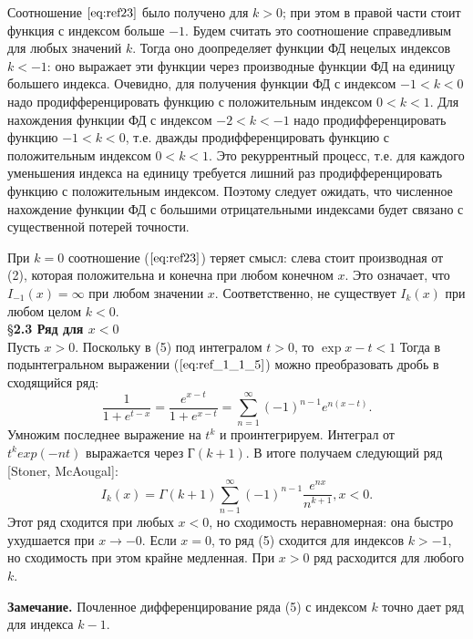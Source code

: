 Соотношение $\ref{eq:ref23}$ было получено для $k > 0$; при этом в правой части стоит
функция с индексом больше $-1$. Будем считать это соотношение справедливым
для любых значений $k$. Тогда оно доопределяет функции ФД нецелых индексов
$k < -1$: оно выражает эти функции через производные функции ФД на единицу
большего индекса. Очевидно, для получения функции ФД с индексом $-1 < k < 0$
надо продифференцировать функцию с положительным индексом $0 < k < 1$. Для
нахождения функции ФД с индексом $-2 < k < -1$ надо продифференцировать
функцию $-1< k < 0$, т.е. дважды продифференцировать функцию с
положительным индексом $0 < k < 1$. Это рекуррентный процесс, т.е. для
каждого уменьшения индекса на единицу требуется лишний раз
продифференцировать функцию с положительным индексом. Поэтому следует
ожидать, что численное нахождение функции ФД с большими отрицательными
индексами будет связано с существенной потерей точности.

При $k = 0$ соотношение ($\ref{eq:ref23}$) теряет смысл: слева стоит производная от (2),
которая положительна и конечна при любом конечном $x$. Это означает, что
$I_{-1}(x) = \infty$ при любом значении $x$. Соответственно, не существует $I_k(x)$ при
любом целом $k < 0$.
\\

\S \textbf{2.3 Ряд для $x < 0$}
\\

Пусть $x > 0$. Поскольку в (5) под интегралом $t > 0$, то $\exp{x-t} < 1$ Тогда в
подынтегральном выражении ($\ref{eq:ref_1_1_5}$) можно преобразовать дробь в сходящийся
ряд:
\begin{equation}
\frac{1}{1+e^{t-x}} = \frac{e^{x-t}}{1+e^{x-t}}=\sum\limits_{n=1}^{\infty} (-1)^{n-1}e^{n(x-t)}.
\end{equation}
Умножим последнее выражение на $t^k$ и проинтегрируем. Интеграл от
$t^{k}exp(-nt)$ выражаeтся через $Г(k + 1)$. В итоге получаем следующий ряд [Stoner, McAougal]:
\begin{equation}
I_k(x)=\Gamma(k+1)\sum\limits_{n-1}^{\infty} (-1)^{n-1}\frac{e^{nx}}{n^{k+1}},x<0.
\end{equation}
Этот ряд сходится при любых $x < 0$, но сходимость неравномерная: она быстро
ухудшается при $x \to -0$. Если $x = 0$, то ряд (5) сходится для индексов $k > -1$, но
сходимость при этом крайне медленная. При $x > 0$ ряд расходится для любого
$k$.

\textbf{Замечание.} Почленное дифференцирование ряда (5) с индексом $k$ точно
дает ряд для индекса $k - 1$.
\\

